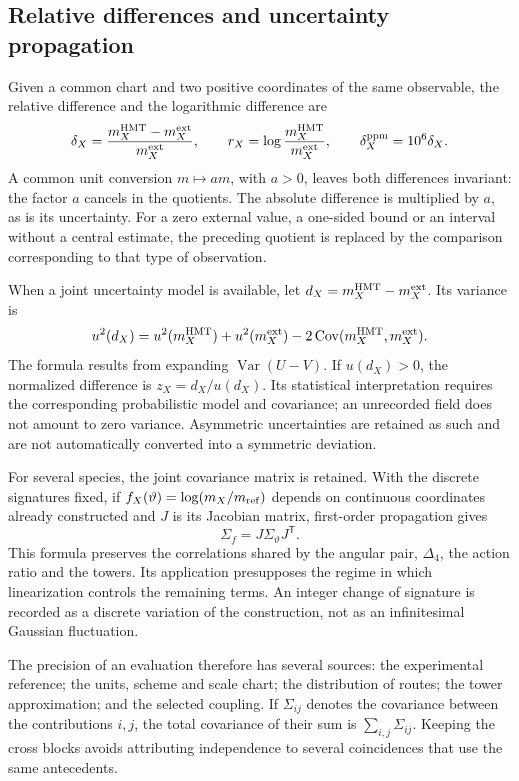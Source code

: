 \subsection{Relative differences and uncertainty propagation}
\label{vi:subsec:vi-residuales}

Given a common chart and two positive coordinates of the same observable,
the relative difference and the logarithmic difference are
\[
 \delta_X=\frac{m_X^{\rm HMT}-m_X^{\rm ext}}{m_X^{\rm ext}},
 \qquad r_X=\log\frac{m_X^{\rm HMT}}{m_X^{\rm ext}},
 \qquad \delta_X^{\rm ppm}=10^6\delta_X.
\]
A common unit conversion \(m\mapsto am\), with \(a>0\),
leaves both differences invariant: the factor \(a\) cancels in the
quotients. The absolute difference is multiplied by \(a\), as is
its uncertainty. For a zero external value, a one-sided bound or an
interval without a central estimate, the preceding quotient is replaced by
the comparison corresponding to that type of observation.

When a joint uncertainty model is available, let
\(d_X=m_X^{\rm HMT}-m_X^{\rm ext}\). Its variance is
\[
 u^2(d_X)=u^2(m_X^{\rm HMT})+u^2(m_X^{\rm ext})
          -2\operatorname{Cov}(m_X^{\rm HMT},m_X^{\rm ext}).
\]
The formula results from expanding
\(\operatorname{Var}(U-V)\). If \(u(d_X)>0\), the normalized
difference is \(z_X=d_X/u(d_X)\). Its statistical interpretation requires
the corresponding probabilistic model and covariance; an unrecorded field
does not amount to zero variance. Asymmetric uncertainties
are retained as such and are not automatically converted into a symmetric
deviation.

For several species, the joint covariance matrix is retained. With
the discrete signatures fixed, if \(f_X(\vartheta)=\log(m_X/m_{\rm ref})\)
depends on continuous coordinates already constructed and \(J\) is its
Jacobian matrix, first-order propagation gives
\[
 \Sigma_f=J\Sigma_\vartheta J^{\mathsf T}.
\]
This formula preserves the correlations shared by the angular pair,
\(\Delta_4\), the action ratio and the towers. Its application presupposes
the regime in which linearization controls the remaining terms.
An integer change of signature is recorded as a discrete variation of the
construction, not as an infinitesimal Gaussian fluctuation.

The precision of an evaluation therefore has several sources: the
experimental reference; the units, scheme and scale chart; the
distribution of routes; the tower approximation; and the selected
coupling. If \(\Sigma_{ij}\) denotes the covariance between the
contributions \(i,j\), the total covariance of their sum is
\(\sum_{i,j}\Sigma_{ij}\). Keeping the cross blocks avoids
attributing independence to several coincidences that use the same
antecedents.

